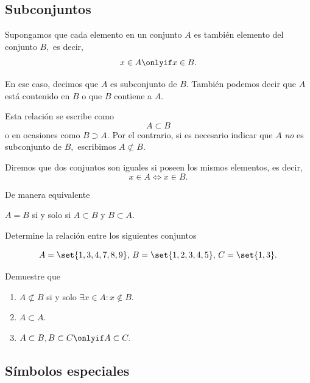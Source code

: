 \subsection{Subconjuntos}


	Supongamos que cada elemento en un conjunto $A$ es tambi\'en elemento del conjunto $B,$ es decir,
	$$
	x\in A \onlyif x\in B.
	$$



	En ese caso, decimos que $A$ es subconjunto de $B.$  Tambi\'en podemos decir que $A$ está contenido en $B$ o que $B$ contiene a $A$.



	Esta relación se escribe como
	$$
	A \subset B 
	$$ o en ocasiones como
	$B\supset A.$  Por el contrario, si es necesario indicar que $A$ \emph{no} es  subconjunto de $B,$ escribimos $A \not\subset B.$



	Diremos que dos conjuntos son iguales si poseen los mismos elementos, es decir, 
	$$
	x \in A \iff x \in B.
	$$



	De manera equivalente 
	\begin{center}
		$A=B$ si y solo si $A \subset B$ y $B \subset A.$
	\end{center}
	



	\begin{problema}
		\label{lip:exmp:1.2}
		Determine la relación entre los siguientes conjuntos
		\begin{center}
			$$A=\set{1,3,4,7,8,9}, \, 
			B=\set{1,2,3,4,5}, \,
			C=\set{1,3}.$$
		\end{center}
		
	\end{problema}
	



	\begin{problema}
		Demuestre que 
		\begin{enumerate}
			\item $A\not\subset B$ si y solo $\exists x\in A: x\notin B.$
			\item $A \subset A.$
			\item $A\subset B, B\subset C \onlyif  A\subset C.$
		\end{enumerate}
		
	\end{problema}
	


\subsection{Símbolos especiales}

